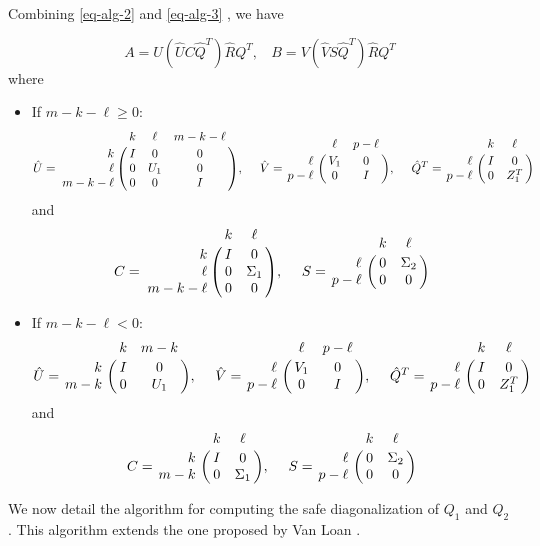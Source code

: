 Combining \eqref{eq-alg-2} and \eqref{eq-alg-3} , we have

\begin{equation} \label{eq-alg-4}
A = U(\hat{U}C\hat{Q}^{T})\hat{R}Q^{T}, \ \ \ \ 
B = V(\hat{V}S\hat{Q}^{T})\hat{R}Q^{T}
\end{equation}
where
\begin{itemize}
\item If $m-k-\ell \geq 0$:
	\[
                \hat{U} = \bordermatrix{ & k & \ell & m-k-\ell\cr
                \hfill k & I & 0 & 0\cr
                \hfill \ell & 0 & U_1 & 0\cr
                \hfill m-k-\ell & 0 & 0 & I}, \  \ \ \
                \hat{V} = \bordermatrix{ & \ell & p-\ell   \cr
                \hfill \ell & V_1 & 0\cr
                \hfill p-\ell & 0 & I}, \ \ \ \
                \hat{Q}^{T} = \bordermatrix{ & k & \ell   \cr
                \hfill \ell & I & 0\cr
                \hfill p-\ell & 0 & Z_1^{T}}
     \]
     and 
     \[
                C = \bordermatrix{ & k & \ell \cr
                \hfill k & I & 0 \cr
                \hfill \ell & 0 & \Sigma_{1} \cr
                \hfill m-k-\ell & 0 & 0}, \  \ \ \
                S = \bordermatrix{ & k & \ell   \cr
                \hfill \ell & 0 & \Sigma_{2}\cr
                \hfill p-\ell & 0 & 0}
    \]
\item If $m-k-\ell < 0$:
	\[
                \hat{U} = \bordermatrix{ & k & m-k \cr
                \hfill k & I & 0 \cr
                \hfill m-k & 0 & U_1}, \  \ \ \
                \hat{V} = \bordermatrix{ & \ell & p-\ell   \cr
                \hfill \ell & V_1 & 0\cr
                \hfill p-\ell & 0 & I}, \ \ \ \
                \hat{Q}^{T} = \bordermatrix{ & k & \ell   \cr
                \hfill \ell & I & 0\cr
                \hfill p-\ell & 0 & Z_1^{T}}
     \]
     and 
     \[
                C = \bordermatrix{ & k & \ell \cr
                \hfill k & I & 0 \cr
                \hfill m-k & 0 & \Sigma_{1}}, \  \ \ \
                S = \bordermatrix{ & k & \ell   \cr
                \hfill \ell & 0 & \Sigma_{2}\cr
                \hfill p-\ell & 0 & 0}
    \]
\end{itemize}

We now detail the algorithm for computing the safe diagonalization of $Q_{1}$ and $Q_{2}$. 
This algorithm extends the one proposed by Van Loan \cite{vanloan85}.    

